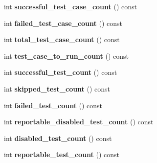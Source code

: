 \begin{DoxyCompactItemize}
\item 
\mbox{\label{classtesting_1_1_unit_test_acaa2ab71f53c25ffe0242a91c14e173f}} 
int {\bfseries successful\+\_\+test\+\_\+case\+\_\+count} () const
\item 
\mbox{\label{classtesting_1_1_unit_test_abc0fa297a4103f7cdd9627ae27d9d0ef}} 
int {\bfseries failed\+\_\+test\+\_\+case\+\_\+count} () const
\item 
\mbox{\label{classtesting_1_1_unit_test_a93fc8f4eebc3212d06468ad216830ced}} 
int {\bfseries total\+\_\+test\+\_\+case\+\_\+count} () const
\item 
\mbox{\label{classtesting_1_1_unit_test_a965248fbe72f9fede5de921b6666943b}} 
int {\bfseries test\+\_\+case\+\_\+to\+\_\+run\+\_\+count} () const
\item 
\mbox{\label{classtesting_1_1_unit_test_a49ee8056e357ad497e67399447dd5a40}} 
int {\bfseries successful\+\_\+test\+\_\+count} () const
\item 
\mbox{\label{classtesting_1_1_unit_test_a0082c74809be04baf7e43842ddac4ae5}} 
int {\bfseries skipped\+\_\+test\+\_\+count} () const
\item 
\mbox{\label{classtesting_1_1_unit_test_ace1c860482b4ae5c341df5a9665e5c08}} 
int {\bfseries failed\+\_\+test\+\_\+count} () const
\item 
\mbox{\label{classtesting_1_1_unit_test_a2a2835db178d5c8569507db9f0a3d54f}} 
int {\bfseries reportable\+\_\+disabled\+\_\+test\+\_\+count} () const
\item 
\mbox{\label{classtesting_1_1_unit_test_ad69ccf3d4a9bc7333badeafbde3bc76b}} 
int {\bfseries disabled\+\_\+test\+\_\+count} () const
\item 
\mbox{\label{classtesting_1_1_unit_test_a449d0e0350ef146040cd37679c005248}} 
int {\bfseries reportable\+\_\+test\+\_\+count} () const
\item 

\end{DoxyCompactItemize}
